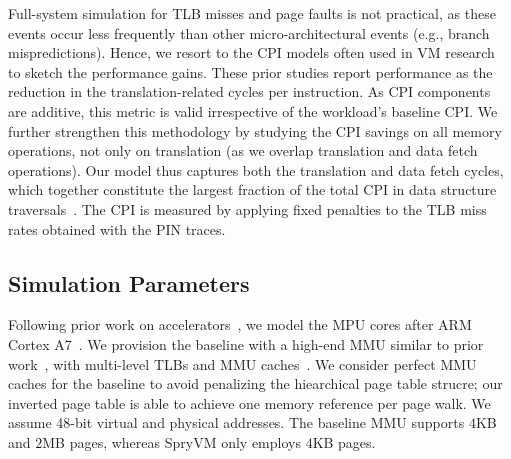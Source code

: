 Full-system simulation for TLB misses and page faults is not practical, as these events occur less frequently than other micro-architectural events (e.g., branch mispredictions). Hence, we resort to the CPI models often used in VM research~\cite{papadopoulou:prediction-based, saulsbury:recently-based, bhattacharjee:shared} to sketch the performance gains. These prior studies report performance as the reduction in the translation-related cycles per instruction. As CPI components are additive, this metric is valid irrespective of the workload's baseline CPI. We further strengthen this methodology by studying the CPI savings on all memory operations, not only on translation (as we overlap translation and data fetch operations). Our model thus captures both the translation and data fetch cycles, which together constitute the largest fraction of the total CPI in data structure traversals~\cite{picorel:near-memory}. The CPI is measured by applying fixed penalties to the TLB miss rates obtained with the PIN traces.

\subsection{Simulation Parameters}
Following prior work on accelerators~\cite{gao:practical, ahn:scalable, pugsley:ndc}, we model the MPU cores after ARM Cortex A7~\cite{arm:cortex-a7}. We provision the baseline with a high-end MMU similar to prior work~\cite{haria:devirtualizing}, with multi-level TLBs and MMU caches~\cite{bhattacharjee:large-reach, barr:translation}. We consider perfect MMU caches for the baseline to avoid penalizing the hiearchical page table strucre; our inverted page table is able to achieve one memory reference per page walk. We assume 48-bit virtual and physical addresses. The baseline MMU supports $4$KB and $2$MB pages, whereas SpryVM only employs $4$KB pages. 


